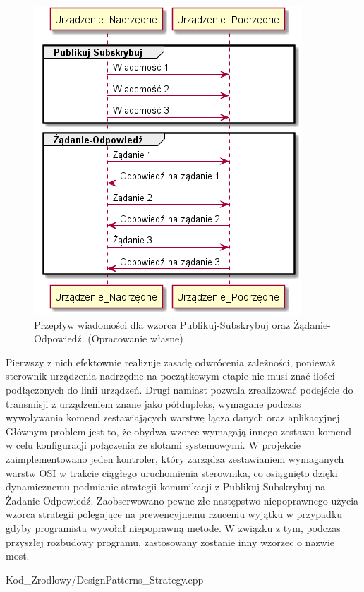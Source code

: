         \begin{figure}[h!]
        \centering
        \includegraphics[scale=0.75]{out/Diagramy/PublishSubscribe_RequestResponse.png}
        \caption{Przepływ wiadomości dla wzorca Publikuj-Subskrybuj oraz Żądanie-Odpowiedź.
            \newline(Opracowanie własne)}
        \end{figure}

        Pierwszy z nich efektownie realizuje zasadę odwrócenia zależności, ponieważ sterownik urządzenia nadrzędne na początkowym etapie nie musi znać
        ilości podłączonych do linii urządzeń. Drugi namiast pozwala zrealizować podejście do transmisji z urządzeniem znane jako półdupleks, wymagane podczas
        wywoływania komend zestawiających warstwę łącza danych oraz aplikacyjnej. Głównym problem jest to, że obydwa wzorce wymagają innego zestawu komend w celu
        konfiguracji połączenia ze slotami systemowymi. W projekcie zaimplementowano jeden kontroler, który zarządza zestawianiem wymaganych warstw OSI w trakcie
        ciągłego uruchomienia sterownika, co osiągnięto dzięki dynamicznemu podmianie strategii komunikacji z Publikuj-Subskrybuj na Żadanie-Odpowiedź.
        Zaobserwowano pewne złe następstwo niepoprawnego użycia wzorca strategii polegające na prewencyjnemu rzuceniu wyjątku w przypadku gdyby programista wywołał niepoprawną metode.
        W związku z tym, podczas przyszłej rozbudowy programu, zastosowany zostanie inny wzorzec o nazwie most.
        \newpage
        
        {Kod_Zrodlowy/DesignPatterns_Strategy.cpp}
    \newpage
